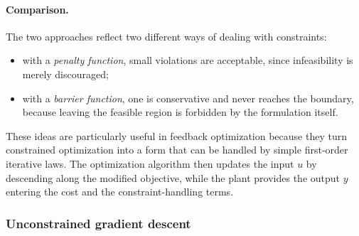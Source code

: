 \paragraph{Comparison.}
The two approaches reflect two different ways of dealing with constraints:
\begin{itemize}
    \item with a \emph{penalty function}, small violations are acceptable, since infeasibility is merely discouraged;
    \item with a \emph{barrier function}, one is conservative and never reaches the boundary, because leaving the feasible region is forbidden by the formulation itself.
\end{itemize}

These ideas are particularly useful in feedback optimization because they turn constrained optimization into a form that can be handled by simple first-order iterative laws. The optimization algorithm then updates the input $u$ by descending along the modified objective, while the plant provides the output $y$ entering the cost and the constraint-handling terms.

\subsubsection{Unconstrained gradient descent}

